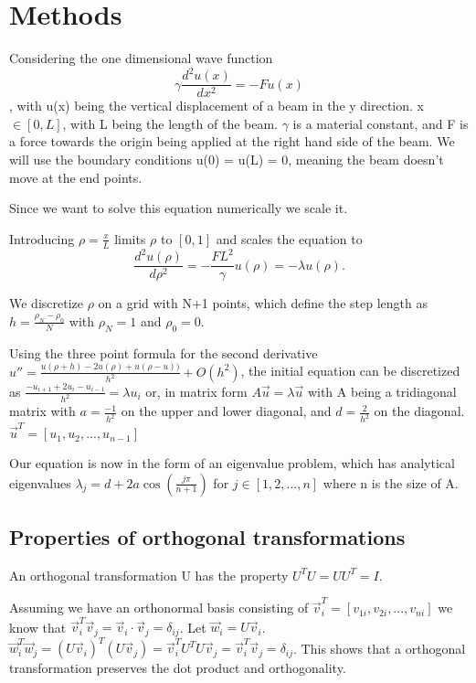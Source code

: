 \section{Methods}


Considering the one dimensional wave function
\begin{equation}
\gamma \frac{d^2 u(x)}{dx^2} = -F u(x)
\end{equation}
, with u(x) being the vertical displacement of a beam in the y direction.
x $\in [0, L]$, with L being the length of the beam. $\gamma$ is a material constant,
and F is a force towards the origin being applied at the right hand side of the beam.
We will use the boundary conditions u(0) = u(L) = 0, meaning the beam doesn't move
at the end points.


Since we want to solve this equation numerically we scale it.

Introducing $ \rho = \frac{x}{L} $ limits $\rho$ to $[0, 1]$ and scales the
equation to
$$\frac{d^2 u(\rho)}{d\rho^2} = - \frac{FL^2}{\gamma} u(\rho) = -\lambda u(\rho).$$

We discretize $\rho$ on a grid with N+1 points, which
define the step length as $h = \frac{\rho_N - \rho_0}{N}$ with $\rho_N = 1$ and
$\rho_0 = 0$.

Using the three point formula for the second derivative $ u'' = \frac{u(\rho + h) - 2u(\rho) +
u(\rho -u))}{h^2} + O(h^2)$, the initial equation can be discretized as
$\frac{-u_{i+1} + 2u_i - u_{i-1}}{h^2} = \lambda u_i$
or, in matrix form
$ A \vec{u} = \lambda \vec{u}$
with A being a tridiagonal matrix with $a = \frac{-1}{h^2}$ on the upper and lower
diagonal, and $d = \frac{2}{h^2}$ on the diagonal. $\vec{u}^T = [u_1, u_2, ..., u_{n-1}]$

Our equation is now in the form of an eigenvalue problem, which has analytical
eigenvalues $\lambda_j = d + 2a\cos{(\frac{j\pi}{n+1})}$ for $j \in [1,2,...,n]$
where n is the size of A.

\subsection{Properties of orthogonal transformations}

An orthogonal transformation U has the property $U^T U = U U^T = I$.

Assuming we have an orthonormal basis consisting of $\vec{v}_i^T = [v_{1i},
v_{2i}, ... , v_{ni}]$ we know that $\vec{v}_i^T \vec{v}_j = \vec{v}_i \cdot
\vec{v}_j = \delta_{ij}$. Let $\vec{w}_i = U\vec{v}_i$. $\vec{w}_i^T \vec{w}_j =
(U\vec{v}_i)^T(U\vec{v}_j) = \vec{v}_i^T U^T U \vec{v}_j = \vec{v}_i^T \vec{v}_j
= \delta_{ij}$. This shows that a orthogonal transformation preserves the dot
product and orthogonality.

